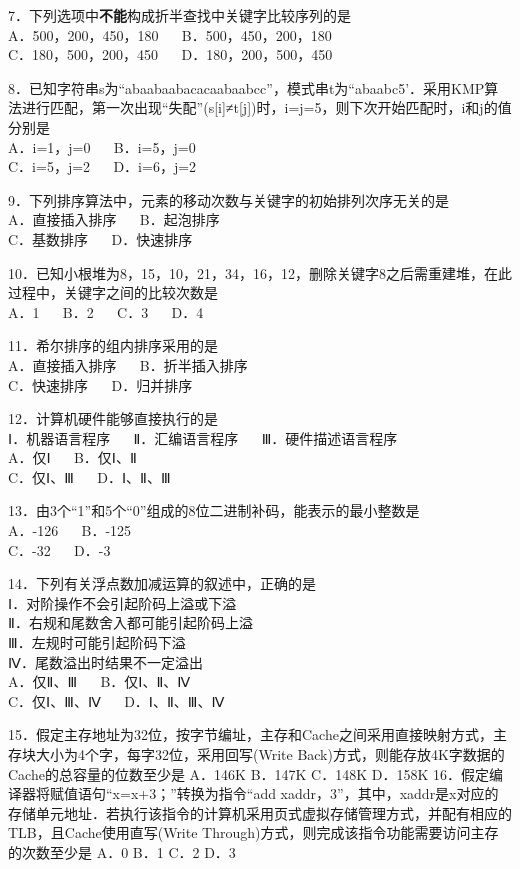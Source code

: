 7．下列选项中\textbf{不能}构成折半查找中关键字比较序列的是 \\
A．500，200，450，180 $\quad$ B．500，450，200，180 \\
C．180，500，200，450 $\quad$ D．180，200，500，450

8．已知字符串s为“abaabaabacacaabaabcc”，模式串t为“abaabc5’．采用KMP算法进行匹配，第一次出现“失配”(s[i]≠t[j])时，i=j=5，则下次开始匹配时，i和j的值分别是 \\
A．i=1，j=0 $\quad$ B．i=5，j=0 \\
C．i=5，j=2 $\quad$ D．i=6，j=2

9．下列排序算法中，元素的移动次数与关键字的初始排列次序无关的是 \\
A．直接插入排序 $\quad$ B．起泡排序 \\
C．基数排序 $\quad$ D．快速排序

10．已知小根堆为8，15，10，21，34，16，12，删除关键字8之后需重建堆，在此过程中，关键字之间的比较次数是 \\
A．1 $\quad$ B．2 $\quad$ C．3 $\quad$ D．4

11．希尔排序的组内排序采用的是 \\
A．直接插入排序 $\quad$ B．折半插入排序 \\
C．快速排序 $\quad$ D．归并排序

12．计算机硬件能够直接执行的是 \\
Ⅰ．机器语言程序 $\quad$ Ⅱ．汇编语言程序 $\quad$ Ⅲ．硬件描述语言程序 \\
A．仅Ⅰ $\quad$ B．仅Ⅰ、Ⅱ \\
C．仅Ⅰ、Ⅲ $\quad$ D．Ⅰ、Ⅱ、Ⅲ

13．由3个“1”和5个“0”组成的8位二进制补码，能表示的最小整数是 \\
A．-126 $\quad$ B．-125 \\
C．-32 $\quad$ D．-3

14．下列有关浮点数加减运算的叙述中，正确的是 \\
Ⅰ．对阶操作不会引起阶码上溢或下溢 \\
Ⅱ．右规和尾数舍入都可能引起阶码上溢 \\
Ⅲ．左规时可能引起阶码下溢 \\
Ⅳ．尾数溢出时结果不一定溢出 \\
A．仅Ⅱ、Ⅲ $\quad$ B．仅Ⅰ、Ⅱ、Ⅳ \\
C．仅Ⅰ、Ⅲ、Ⅳ $\quad$ D．Ⅰ、Ⅱ、Ⅲ、Ⅳ

15．假定主存地址为32位，按字节编址，主存和Cache之间采用直接映射方式，主存块大小为4个字，每字32位，采用回写(Write Back)方式，则能存放4K字数据的Cache的总容量的位数至少是
A．146K B．147K
C．148K D．158K
16．假定编译器将赋值语句“x=x+3；”转换为指令“add xaddr，3”，其中，xaddr是x对应的存储单元地址．若执行该指令的计算机采用页式虚拟存储管理方式，并配有相应的TLB，且Cache使用直写(Write Through)方式，则完成该指令功能需要访问主存的次数至少是
A．0 B．1
C．2 D．3

